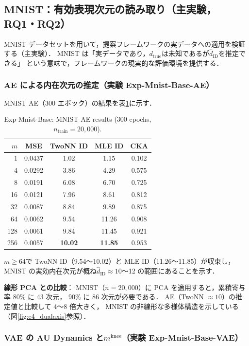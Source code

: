 \documentclass[11pt,a4paper]{jsarticle}
\newcommand{\dtrue}{d_{\mathrm{true}}}
\newcommand{\mknee}{m^{\mathrm{knee}}}
\begin{document}
\subsection{MNIST：有効表現次元の読み取り（主実験，RQ1・RQ2）}\label{sec:exp_mnist}

MNIST データセットを用いて，提案フレームワークの実データへの適用を検証する（主実験）．
MNIST は「実データであり，$\dtrue$は未知であるが$\hat{d}_\mathrm{ID}$を推定できる」
という意味で，フレームワークの現実的な評価環境を提供する．

\subsubsection{AE による内在次元の推定（実験 Exp-Mnist-Base-AE）}

MNIST AE（300 エポック）の結果を表\ref{tab:e4_ae}に示す．

\begin{table}[H]
\centering
\caption{Exp-Mnist-Base: MNIST AE results (300 epochs, $n_\mathrm{train}=20{,}000$).}
\label{tab:e4_ae}
\small
\begin{tabular}{rcccc}
\toprule
$m$ & MSE & TwoNN ID & MLE ID & CKA \\
\midrule
1   & 0.0437 & 1.02  & 1.15  & 0.102 \\
4   & 0.0292 & 3.86  & 4.29  & 0.575 \\
8   & 0.0191 & 6.08  & 6.70  & 0.725 \\
16  & 0.0121 & 7.96  & 8.61  & 0.812 \\
32  & 0.0087 & 8.84  & 9.89  & 0.875 \\
64  & 0.0062 & 9.54  & 11.26 & 0.908 \\
128 & 0.0061 & 9.84  & 11.45 & 0.921 \\
256 & 0.0057 & \textbf{10.02} & \textbf{11.85} & 0.953 \\
\bottomrule
\end{tabular}
\end{table}

$m \geq 64$で TwoNN ID（9.54〜10.02）と MLE ID（11.26〜11.85）が収束し，
MNIST の実効内在次元が概ね$\hat{d}_\mathrm{ID} \approx 10$〜12 の範囲にあることを示す．

\textbf{線形 PCA との比較}：
MNIST（$n = 20{,}000$）に PCA を適用すると，累積寄与率 80\% に 43 次元，
90\% に 86 次元が必要である．
AE（TwoNN $\approx 10$）の推定値と比較して 4〜8 倍大きく，
MNIST の非線形な多様体構造を示している（図\ref{fig:e4_dualaxis}参照）．

\subsubsection{VAE の AU Dynamics と$\mknee$（実験 Exp-Mnist-Base-VAE）}
\end{document}
